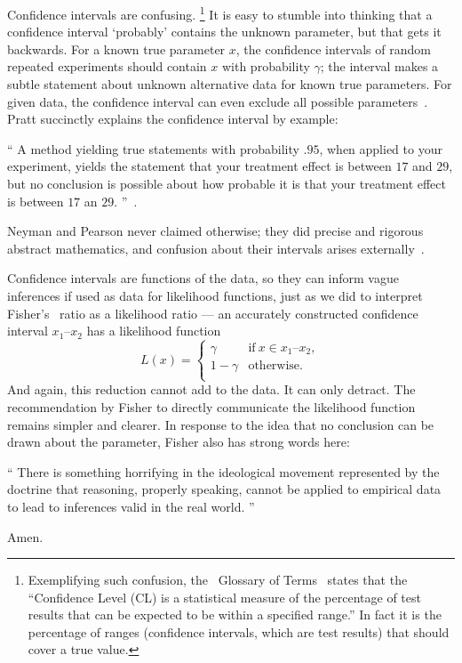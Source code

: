 Confidence intervals are confusing.%
\footnote{%
Exemplifying such confusion,
the \atlas\ Glossary of Terms~\cite{atlas2022glossary} states that the
``Confidence Level (CL) is a statistical measure of the percentage of test
results that can be expected to be within a specified range.''
In fact it is the percentage of ranges
(confidence intervals, which are test results)
that should cover a true value.%
}
It is easy to stumble into thinking that a confidence interval
`probably' contains the unknown parameter, but that gets it backwards.
For a known true parameter $x$, the confidence intervals of random repeated
experiments should contain $x$ with probability $\gamma$;
the interval makes a subtle statement about unknown alternative data for
known true parameters.
For given data, the confidence interval can even exclude all possible
parameters~\cite{
pratt1961testing,
Jaynes1976intervals
}.
Pratt succinctly explains the confidence interval by example:
\begin{displayquote}
\small
``%
A method yielding true statements with probability $.95$, when applied to your
experiment, yields the statement that your treatment effect is between $17$ and
$29$, but no conclusion is possible about how probable it is that your
treatment effect is between $17$ an $29$.%
''~\cite{pratt1961testing}.
\end{displayquote}
Neyman and Pearson never claimed otherwise; they did precise and rigorous
abstract mathematics, and confusion about their intervals arises
externally~\cite{jaynes2003probability}.

Confidence intervals are functions of the data, so they can inform vague
inferences if used as data for likelihood functions, just as we did to
interpret Fisher's \pvalue\ ratio as a likelihood ratio ---
an accurately constructed confidence interval $x_1\textrm{--}x_2$ has a
likelihood function
\begin{equation}
L(x) =
\left\{
\begin{matrix}
\gamma & \textrm{if}~x \in x_1\textrm{--}x_2, \\
1 - \gamma & \textrm{otherwise.} \\
\end{matrix}
\right.
\end{equation}
And again, this reduction cannot add to the data.
It can only detract.
The recommendation by Fisher to directly communicate the likelihood function
remains simpler and clearer.
In response to the idea that no conclusion can be drawn about the parameter,
Fisher also has strong words here:
\begin{displayquote}
\small
``%
There is something horrifying in the ideological movement represented by the
doctrine that reasoning, properly speaking, cannot be applied to empirical data
to lead to inferences valid in the real world.%
''~\cite{fisher1956statistical}
\end{displayquote}
Amen.

